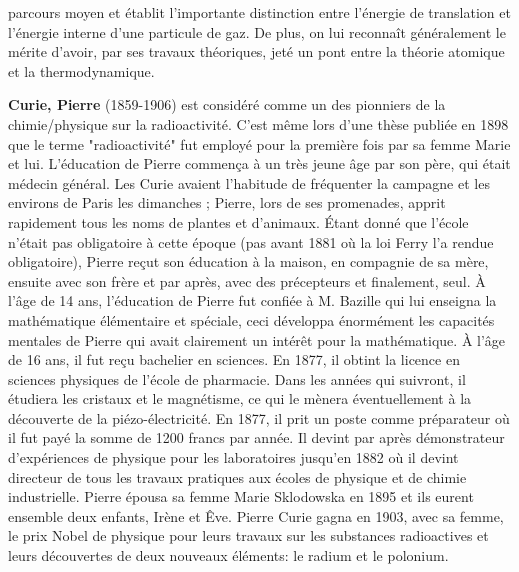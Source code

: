 parcours moyen et établit l'importante distinction entre l'énergie de translation et l'énergie interne d'une particule de gaz. De plus, on lui reconnaît généralement le mérite d'avoir, par ses travaux théoriques, jeté un pont entre la théorie atomique et la thermodynamique.

\textbf{Curie, Pierre} (1859-1906) est considéré comme un des pionniers de la chimie/physique sur la radioactivité. C'est même lors d'une thèse publiée en 1898 que le terme "radioactivité" fut employé pour la première fois par sa femme Marie et lui. L'éducation de Pierre commença à un très jeune âge par son père, qui était médecin général. Les Curie avaient l'habitude de fréquenter la campagne et les environs de Paris les dimanches ; Pierre, lors de ses promenades, apprit rapidement tous les noms de plantes et d'animaux. Étant donné que l'école n'était pas obligatoire à cette époque (pas avant 1881 où la loi Ferry l'a rendue obligatoire), Pierre reçut son éducation à la maison, en compagnie de sa mère, ensuite avec son frère et par après, avec des précepteurs et finalement, seul. À l'âge de 14 ans, l'éducation de Pierre fut confiée à M. Bazille qui lui enseigna la mathématique élémentaire et spéciale, ceci développa énormément les capacités mentales de Pierre qui avait clairement un intérêt pour la mathématique. À l'âge de 16 ans, il fut reçu bachelier en sciences. En 1877, il obtint la licence en sciences physiques de l'école de pharmacie. Dans les années qui suivront, il étudiera les cristaux et le magnétisme, ce qui le mènera éventuellement à la découverte de la piézo-électricité. En 1877, il prit un poste comme préparateur où il fut payé la somme de 1200 francs par année. Il devint par après démonstrateur d'expériences de physique pour les laboratoires jusqu'en 1882 où il devint directeur de tous les travaux pratiques aux écoles de physique et de chimie industrielle. Pierre épousa sa femme Marie Sklodowska en 1895 et ils eurent ensemble deux enfants, Irène et Êve. Pierre Curie gagna en 1903, avec sa femme, le prix Nobel de physique pour leurs travaux sur les substances radioactives et leurs découvertes de deux nouveaux éléments: le radium et le polonium.

